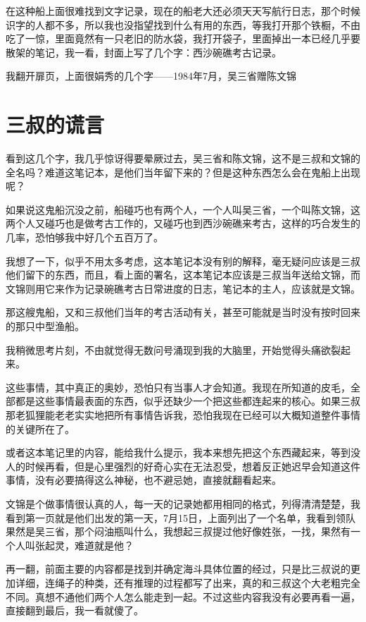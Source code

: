 在这种船上面很难找到文字记录，现在的船老大还必须天天写航行日志，那个时候识字的人都不多，所以我也没指望找到什么有用的东西，等我打开那个铁橱，不由吃了一惊，里面竟然有一只老旧的防水袋，我打开袋子，里面掉出一本已经几乎要散架的笔记，我一看，封面上写了几个字：西沙碗礁考古记录。

我翻开扉页，上面很娟秀的几个字——1984年7月，吴三省赠陈文锦

\chapter{三叔的谎言}

看到这几个字，我几乎惊讶得要晕厥过去，吴三省和陈文锦，这不是三叔和文锦的全名吗？难道这笔记本，是他们当年留下来的？但是这种东西怎么会在鬼船上出现呢？

如果说这鬼船沉没之前，船碰巧也有两个人，一个人叫吴三省，一个叫陈文锦，这两个人又碰巧也是做考古工作的，又碰巧也到西沙碗礁来考古，这样的巧合发生的几率，恐怕够我中好几个五百万了。

我想了一下，似乎不用太多考虑，这本笔记本没有别的解释，毫无疑问应该是三叔他们留下的东西，而且，看上面的署名，这本笔记本应该是三叔当年送给文锦，而文锦则用它来作为记录碗礁考古日常进度的日志，笔记本的主人，应该就是文锦。

那这艘鬼船，又和三叔他们当年的考古活动有关，甚至可能就是当时没有按时回来的那只中型渔船。

我稍微思考片刻，不由就觉得无数问号涌现到我的大脑里，开始觉得头痛欲裂起来。

这些事情，其中真正的奥妙，恐怕只有当事人才会知道。我现在所知道的皮毛，全部都是这些事情最表面的东西，似乎还缺少一个把这些都连起来的核心。如果三叔那老狐狸能老老实实地把所有事情告诉我，恐怕我现在已经可以大概知道整件事情的关键所在了。

或者这本笔记里的内容，能给我什么提示，我本来想先把这个东西藏起来，等到没人的时候再看，但是心里强烈的好奇心实在无法忍受，想着反正她迟早会知道这件事情，没有必要搞得这么神秘，也不避忌她，直接就翻看起来。

文锦是个做事情很认真的人，每一天的记录她都用相同的格式，列得清清楚楚，我看到第一页就是他们出发的第一天，7月15日，上面列出了一个名单，我看到领队果然是吴三省，那个闷油瓶叫什么，我想起三叔提过他好像姓张，一找，果然有一个人叫张起灵，难道就是他？

再一翻，前面主要的内容都是找到并确定海斗具体位置的经过，只是比三叔说的更加详细，连绳子的种类，还有推理的过程都写了出来，真的和三叔这个大老粗完全不同。真想不通他们两个人怎么能走到一起。不过这些内容我没有必要再看一遍，直接翻到最后，我一看就傻了。

